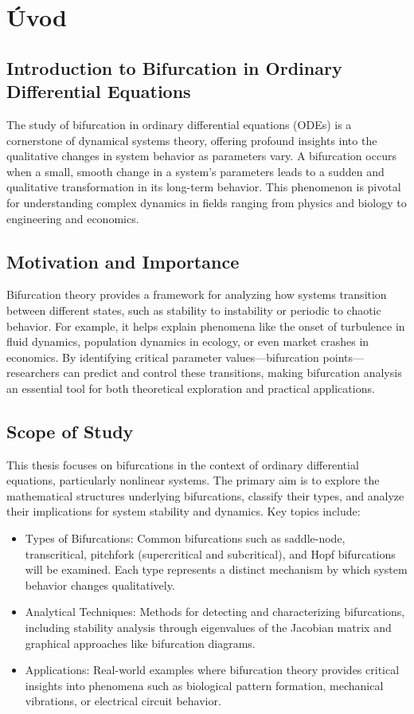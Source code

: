 \chapter{Úvod}

\section{Introduction to Bifurcation in Ordinary Differential Equations}

The study of bifurcation in ordinary differential equations (ODEs) is a cornerstone of dynamical systems theory, offering profound insights into the qualitative changes in system behavior as parameters vary. A bifurcation occurs when a small, smooth change in a system's parameters leads to a sudden and qualitative transformation in its long-term behavior. This phenomenon is pivotal for understanding complex dynamics in fields ranging from physics and biology to engineering and economics.

\section{Motivation and Importance}

Bifurcation theory provides a framework for analyzing how systems transition between different states, such as stability to instability or periodic to chaotic behavior. For example, it helps explain phenomena like the onset of turbulence in fluid dynamics, population dynamics in ecology, or even market crashes in economics. By identifying critical parameter values—bifurcation points—researchers can predict and control these transitions, making bifurcation analysis an essential tool for both theoretical exploration and practical applications.

\section{Scope of Study}

This thesis focuses on bifurcations in the context of ordinary differential equations, particularly nonlinear systems. The primary aim is to explore the mathematical structures underlying bifurcations, classify their types, and analyze their implications for system stability and dynamics. Key topics include:

\begin{itemize}
\item Types of Bifurcations: Common bifurcations such as saddle-node, transcritical, pitchfork (supercritical and subcritical), and Hopf bifurcations will be examined. Each type represents a distinct mechanism by which system behavior changes qualitatively.
\item Analytical Techniques: Methods for detecting and characterizing bifurcations, including stability analysis through eigenvalues of the Jacobian matrix and graphical approaches like bifurcation diagrams.
\item Applications: Real-world examples where bifurcation theory provides critical insights into phenomena such as biological pattern formation, mechanical vibrations, or electrical circuit behavior.
\end{itemize}


